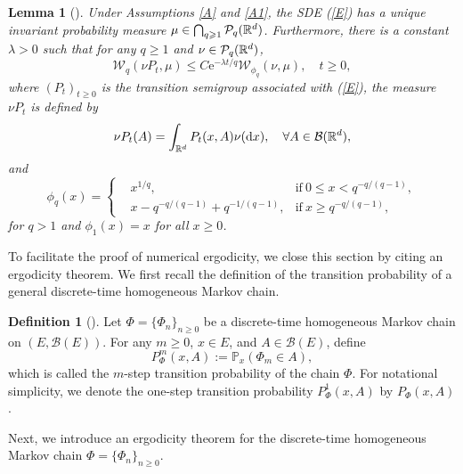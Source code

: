 \documentclass[aap]{imsart}
\theoremstyle{plain}
\newtheorem{lemma}[theorem]{Lemma}
\theoremstyle{definition}
\newtheorem{definition}[theorem]{Definition}
\begin{document}
\begin{lemma}[{\cite[Corollary 1.8]{MN}}]\label{LeX}
Under Assumptions \ref{A} and \ref{A1}, the SDE (\ref{E}) has a unique invariant probability measure $\mu\in \bigcap_{q\geqslant 1}\mathcal{P}_q(\mathbb{R}^d)$. Furthermore, there is a constant $\lambda>0$ such that for any $q\geqslant 1$ and $\nu\in\mathcal{P}_q(\mathbb{R}^d)$,
\begin{equation*}
\mathcal{W}_q(\nu P_t, \mu)\leqslant C\mathrm{e}^{-\lambda t/q}\mathcal{W}_{\phi_q}(\nu, \mu), \quad t\geqslant 0,
\end{equation*}
where $(P_t)_{t\geqslant 0}$ is the transition semigroup associated with (\ref{E}), the measure $\nu P_t$ is defined by
\[\nu P_t (A) = \int_{\mathbb{R}^d}P_t(x, A)\nu(\mathrm{d} x),\quad \forall A\in\mathcal{B}(\mathbb{R}^d),\]
and
\begin{equation*}
\phi_q(x) =\left\{
\begin{aligned}
&x^{1/q},& \text{if}~0\leqslant x< q^{-q/(q-1)},\\
&x-q^{-q/(q-1)}+q^{-1/(q-1)},& \text{if}~ x\geqslant q^{-q/(q-1)},
\end{aligned}\right.
\end{equation*}
for $q>1$ and $\phi_1(x) = x$ for all $x\geqslant 0$.
\end{lemma}	
	
To facilitate the proof of numerical ergodicity, we close this section by citing an ergodicity theorem. We first recall the definition of the transition probability of a general discrete-time homogeneous Markov chain.
\begin{definition}[{\cite{Meyn}}]
	Let \(\Phi=\{\Phi_n\}_{n\geqslant0}\) be a discrete-time homogeneous Markov chain on \((E,\mathcal{B}(E))\). For any \(m\geqslant0\), \(x\in E\), and \(A\in\mathcal{B}(E)\), define
	\[
	P^m_{\Phi}(x,A):=\mathbb{P}_x(\Phi_m\in A),
	\]
	which is called the \(m\)-step transition probability of the chain \(\Phi\). For notational simplicity, we denote the one-step transition probability \(P^1_{\Phi}(x,A)\) by \(P_{\Phi}(x,A)\).
\end{definition}
Next, we introduce an ergodicity theorem for the discrete-time homogeneous Markov chain \(\Phi=\{\Phi_n\}_{n\geqslant0}\).
\end{document}
